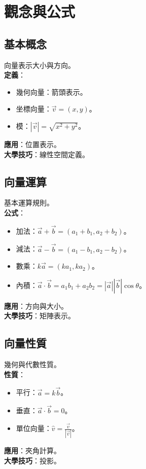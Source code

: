 \section{觀念與公式}

\subsection{基本概念}
向量表示大小與方向。\\
\textbf{定義}：
\begin{itemize}
    \item 幾何向量：箭頭表示。
    \item 坐標向量：$\vec{v} = (x, y)$。
    \item 模：$|\vec{v}| = \sqrt{x^2 + y^2}$。
\end{itemize}
\textbf{應用}：位置表示。\\
\textbf{大學技巧}：線性空間定義。

\subsection{向量運算}
基本運算規則。\\
\textbf{公式}：
\begin{itemize}
    \item 加法：$\vec{a} + \vec{b} = (a_1 + b_1, a_2 + b_2)$。
    \item 減法：$\vec{a} - \vec{b} = (a_1 - b_1, a_2 - b_2)$。
    \item 數乘：$k\vec{a} = (ka_1, ka_2)$。
    \item 內積：$\vec{a} \cdot \vec{b} = a_1 b_1 + a_2 b_2 = |\vec{a}| |\vec{b}| \cos \theta$。
\end{itemize}
\textbf{應用}：方向與大小。\\
\textbf{大學技巧}：矩陣表示。

\subsection{向量性質}
幾何與代數性質。\\
\textbf{性質}：
\begin{itemize}
    \item 平行：$\vec{a} = k\vec{b}$。
    \item 垂直：$\vec{a} \cdot \vec{b} = 0$。
    \item 單位向量：$\hat{v} = \frac{\vec{v}}{|\vec{v}|}$。
\end{itemize}
\textbf{應用}：夾角計算。\\
\textbf{大學技巧}：投影。

